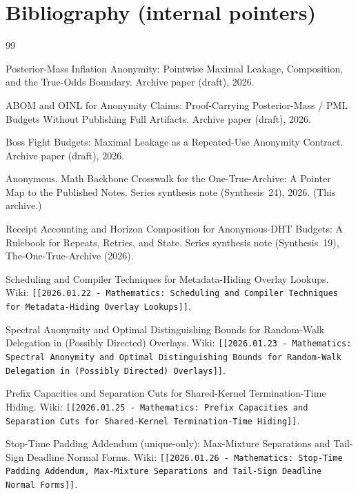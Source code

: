 \documentclass[11pt]{article}
\begin{document}
\section{Bibliography (internal pointers)}
\begin{thebibliography}{99}

Posterior-Mass Inflation Anonymity: Pointwise Maximal Leakage, Composition, and the True-Odds Boundary.
\newblock Archive paper (draft), 2026.

ABOM and OINL for Anonymity Claims: Proof-Carrying Posterior-Mass / PML Budgets Without Publishing Full Artifacts.
\newblock Archive paper (draft), 2026.

Boss Fight Budgets: Maximal Leakage as a Repeated-Use Anonymity Contract.
\newblock Archive paper (draft), 2026.

Anonymous.
\newblock Math Backbone Crosswalk for the One-True-Archive: A Pointer Map to the Published Notes.
\newblock Series synthesis note (Synthesis~24), 2026. (This archive.)

Receipt Accounting and Horizon Composition for Anonymous-DHT Budgets: A Rulebook for Repeats, Retries, and State.
\newblock Series synthesis note (Synthesis~19), The-One-True-Archive (2026).

Scheduling and Compiler Techniques for Metadata-Hiding Overlay Lookups.
\newblock Wiki: \texttt{[[2026.01.22 - Mathematics: Scheduling and Compiler Techniques for Metadata-Hiding Overlay Lookups]]}.

Spectral Anonymity and Optimal Distinguishing Bounds for Random-Walk Delegation in (Possibly Directed) Overlays.
\newblock Wiki: \texttt{[[2026.01.23 - Mathematics: Spectral Anonymity and Optimal Distinguishing Bounds for Random-Walk Delegation in (Possibly Directed) Overlays]]}.

Prefix Capacities and Separation Cuts for Shared-Kernel Termination-Time Hiding.
\newblock Wiki: \texttt{[[2026.01.25 - Mathematics: Prefix Capacities and Separation Cuts for Shared-Kernel Termination-Time Hiding]]}.

Stop-Time Padding Addendum (unique-only): Max-Mixture Separations and Tail-Sign Deadline Normal Forms.
\newblock Wiki: \texttt{[[2026.01.26 - Mathematics: Stop-Time Padding Addendum, Max-Mixture Separations and Tail-Sign Deadline Normal Forms]]}.


\end{thebibliography}
\end{document}
